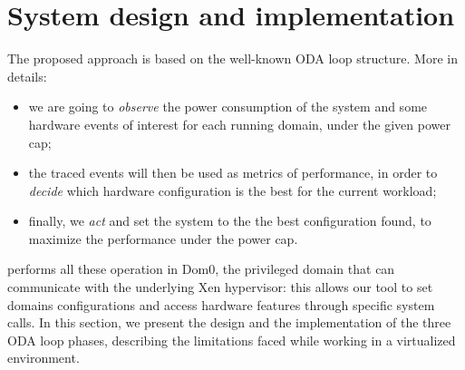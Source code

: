 \section{System design and implementation}
\label{sec:implementation}


The proposed approach is based on the well-known \gls{ODA} loop structure. More in details:
\begin{itemize}
\item we are going to \emph{observe} the power consumption of the system and some hardware events of interest for each running domain, under the given power cap;
\item the traced events will then be used as metrics of performance, in order to \emph{decide} which hardware configuration is the best for the current workload;
\item finally, we \emph{act} and set the system to the the best configuration found, to maximize the performance under the power cap. 
\end{itemize}

\xempupil performs all these operation in Dom0, the privileged domain that can communicate with the underlying Xen hypervisor: this allows our tool to set domains configurations and access hardware features through specific system calls. 
In this section, we present the design and the implementation of the three \gls{ODA} loop phases, describing the limitations faced while working in a virtualized environment. 


